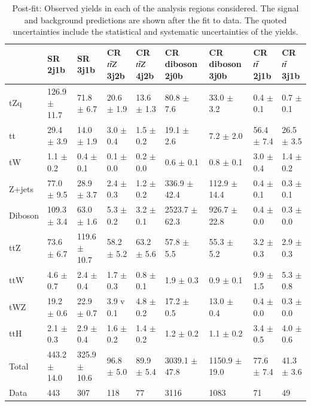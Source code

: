 \begin{table}[h!]
    \centering
    \begin{adjustbox}{width=\textwidth}
    \begin{tabular}{@{} *9l  @{}}
    \toprule
     & SR 2j1b & SR 3j1b & CR $t\Bar{t}Z$ 3j2b & CR $t\Bar{t}Z$ 4j2b & CR diboson 2j0b & CR diboson 3j0b & CR $t\Bar{t}$ 2j1b & CR $t\Bar{t}$ 3j1b \\
\midrule
  tZq   & 126.9 $\pm$  11.7 & 71.8 $\pm$  6.7 & 20.6 $\pm$  1.9 & 13.6 $\pm$  1.3 & 80.8 $\pm$  7.6 & 33.0 $\pm$  3.2 & 0.4 $\pm$  0.1 & 0.7 $\pm$  0.1 \\ 
  tt   & 29.4 $\pm$  3.9 & 14.0 $\pm$  1.9 & 3.0 $\pm$  0.4 & 1.5 $\pm$  0.2 & 19.1 $\pm$  2.6 & 7.2 $\pm$  2.0 & 56.4 $\pm$  7.4 & 26.5 $\pm$  3.5 \\ 
  tW   & 1.1 $\pm$  0.2 & 0.4 $\pm$  0.1 & 0.1 $\pm$  0.0 & 0.2 $\pm$  0.0 & 0.6 $\pm$  0.1 & 0.8 $\pm$  0.1 & 3.0 $\pm$  0.4 & 1.4 $\pm$  0.2 \\ 
  Z+jets   & 77.0 $\pm$  9.5 & 28.9 $\pm$  3.7 & 2.4 $\pm$  0.3 & 1.2 $\pm$  0.2 & 336.9 $\pm$  42.4 & 112.9 $\pm$  14.4 & 0.4 $\pm$  0.1 & 0.3 $\pm$  0.1 \\ 
  Diboson   & 109.3 $\pm$  3.4 & 63.0 $\pm$  1.6 & 5.3 $\pm$  0.2 & 3.2 $\pm$  0.1 & 2523.7 $\pm$  62.3 & 926.7 $\pm$  22.8 & 0.4 $\pm$  0.0 & 0.3 $\pm$  0.0 \\ 
  ttZ   & 73.6 $\pm$  6.7 & 119.6 $\pm$  10.7 & 58.2 $\pm$  5.2 & 63.2 $\pm$  5.6 & 57.8 $\pm$  5.5 & 55.3 $\pm$  5.2 & 3.2 $\pm$  0.3 & 2.9 $\pm$  0.3 \\ 
  ttW   & 4.6 $\pm$ 0.7 & 2.4 $\pm$  0.4 & 1.7 $\pm$  0.3 & 0.8 $\pm$  0.1 & 1.9 $\pm$  0.3 & 0.9 $\pm$  0.1 & 9.9 $\pm$  1.5 & 5.3 $\pm$  0.8 \\ 
  tWZ   & 19.2 $\pm$  0.6 & 22.9 $\pm$  0.7 & 3.9 v 0.1 & 4.8 $\pm$ 0.2 & 17.2 $\pm$  0.5 & 13.0 $\pm$  0.4 & 0.4 $\pm$  0.0 & 0.3 $\pm$  0.0 \\ 
  ttH   & 2.1 $\pm$  0.3 & 2.9 $\pm$  0.4 & 1.6 $\pm$  0.2 & 1.4 $\pm$  0.2 & 1.2 $\pm$  0.2 & 1.1 $\pm$  0.2 & 3.4 $\pm$  0.5 & 4.0 $\pm$  0.6 \\ 
\hline 
  Total  & 443.2 $\pm$  14.0 & 325.9 $\pm$  10.6 & 96.8 $\pm$  5.0 & 89.9 $\pm$  5.4 & 3039.1 $\pm$  47.8 & 1150.9 $\pm$  19.0 & 77.6 $\pm$  7.4 & 41.3 $\pm$  3.6 \\ 
\hline 
  Data   & 443 & 307 & 118 & 77 & 3116 & 1083 & 71 & 49 \\ 
\bottomrule
 \end{tabular}
 \end{adjustbox}
 \caption{Post-fit: Observed yields in each of the analysis regions considered. The signal and background predictions are shown after the fit to data. The quoted uncertainties include the statistical and systematic uncertainties of the yields.}
 \label{tab:postfityield}
 \end{table}


